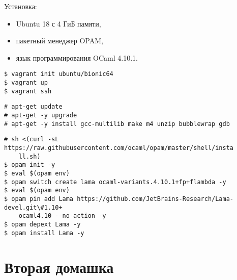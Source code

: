 Установка:

\begin{itemize}
    \item Ubuntu 18 с 4 ГиБ памяти,
    \item пакетный менеджер OPAM,
    \item язык программирования OCaml 4.10.1.
\end{itemize}

\begin{Verbatim}
$ vagrant init ubuntu/bionic64
$ vagrant up
$ vagrant ssh
\end{Verbatim}

\begin{Verbatim}
# apt-get update
# apt-get -y upgrade
# apt-get -y install gcc-multilib make m4 unzip bubblewrap gdb
\end{Verbatim}

\begin{Verbatim}
# sh <(curl -sL https://raw.githubusercontent.com/ocaml/opam/master/shell/insta
    ll.sh)
$ opam init -y
$ eval $(opam env)
$ opam switch create lama ocaml-variants.4.10.1+fp+flambda -y
$ eval $(opam env)
$ opam pin add Lama https://github.com/JetBrains-Research/Lama-devel.git\#1.10+
    ocaml4.10 --no-action -y
$ opam depext Lama -y
$ opam install Lama -y
\end{Verbatim}

\section{Вторая домашка}


